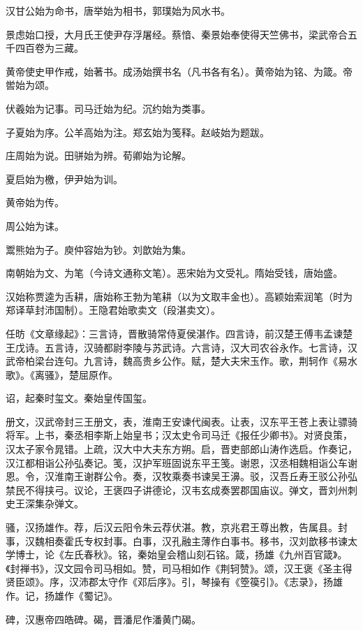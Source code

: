 \documentclass[a4paper,12pt,UTF8,twoside]{ctexbook}
\begin{document}
    汉甘公始为命书，唐举始为相书，郭璞始为风水书。
    
    景虑始口授，大月氏王使尹存浮屠经。蔡愔、秦景始奉使得天竺佛书，梁武帝合五千四百卷为三藏。
    
    黄帝使史甲作戒，始著书。成汤始撰书名（凡书各有名）。黄帝始为铭、为箴。帝喾始为颂。
    
    伏羲始为记事。司马迁始为纪。沉约始为类事。
    
    子夏始为序。公羊高始为注。郑玄始为笺释。赵岐始为题跋。
    
    庄周始为说。田骈始为辨。荀卿始为论解。
    
    夏启始为檄，伊尹始为训。
    
    黄帝始为传。
    
    周公始为诔。
    
    鬻熊始为子。庾仲容始为钞。刘歆始为集。
    
    南朝始为文、为笔（今诗文通称文笔）。恶宋始为文受礼。隋始受钱，唐始盛。
    
    汉始称贾逵为舌耕，唐始称王勃为笔耕（以为文取丰金也）。高颖始索润笔（时为郑译草封沛国制）。王隐君始歌卖文（段湛卖文）。
    
    任昉《文章缘起》：三言诗，晋散骑常侍夏侯湛作。四言诗，前汉楚王傅韦孟谏楚王戊诗。五言诗，汉骑都尉李陵与苏武诗。六言诗，汉大司农谷永作。七言诗，汉武帝柏梁台连句。九言诗，魏高贵乡公作。赋，楚大夫宋玉作。歌，荆轲作《易水歌》。《离骚》，楚屈原作。
    
    诏，起秦时玺文。秦始皇传国玺。
    
    册文，汉武帝封三王册文，表，淮南王安谏代闽表。让表，汉东平王苍上表让骠骑将军。上书，秦丞相李斯上始皇书；汉太史令司马迁《报任少卿书》。对贤良策，汉太子家令晁错。上疏，汉大中大夫东方朔。启，晋吏部郎山涛作选启。作奏记，汉江都相诣公孙弘奏记。笺，汉护军班固说东平王笺。谢恩，汉丞相魏相诣公车谢恩。令，汉淮南王谢群公令。奏，汉牧乘奏书谏吴王濞。驳，汉吾丘寿王驳公孙弘禁民不得挟弓。议论，王褒四子讲德论，汉韦玄成奏罢郡国庙议。弹文，晋刘州刺史王深集杂弹文。
    
    骚，汉扬雄作。荐，后汉云阳令朱云荐伏湛。教，京兆君王尊出教，告属县。封事，汉魏相奏霍氏专权封事。白事，汉孔融主薄作白事书。移书，汉刘歆移书谏太学博士，论《左氏春秋》。铭，秦始皇会稽山刻石铭。箴，扬雄《九州百官箴》。《封禅书》，汉文园令司马相如。赞，司马相如作《荆轲赞》。颂，汉王褒《圣主得贤臣颂》。序，汉沛郡太守作《邓后序》。引，琴操有《箜篌引》。《志录》，扬雄作。记，扬雄作《蜀记》。
    
    碑，汉惠帝四皓碑。碣，晋潘尼作潘黄门碣。
    
\end{document}
